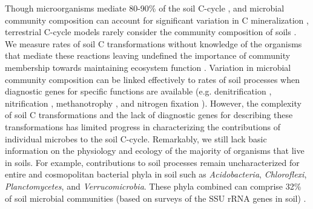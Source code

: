 Though microorganisms mediate 80-90\% of the soil C-cycle
\citep{ColemanCrossley_1996,Nannipieri_2003}, and microbial community
composition can account for significant variation in C mineralization
\citep{Strickland_2009} , terrestrial C-cycle models rarely consider the
community composition of soils \citep{Zak2006,Reed2007}. We measure rates of
soil C transformations without knowledge of the organisms that
mediate these reactions \citep{Nannipieri_2003} leaving undefined the
importance of community membership towards maintaining ecosystem function
\citep{Nannipieri_2003,Schimel_2012,Allison_2008}. Variation in microbial
community composition can be linked effectively to rates of soil processes when
diagnostic genes for specific functions are available (e.g. denitrification
\citep{Cavigelli2000}, nitrification \citep{Carney2004,Hawkes2005,Webster2005},
methanotrophy \citep{Gulledge1997}, and nitrogen fixation \citep{Hsu2009}).
However, the complexity of soil C transformations and the lack of diagnostic
genes for describing these transformations has limited progress in
characterizing the contributions of individual microbes to the soil C-cycle.
Remarkably, we still lack basic information on the physiology and ecology of
the majority of organisms that live in soils. For example, contributions to
soil processes remain uncharacterized for entire and cosmopolitan bacterial
phyla in soil  such as \textit{Acidobacteria}, \textit{Chloroflexi},
\textit{Planctomycetes}, and \textit{Verrucomicrobia}. These phyla combined can
comprise 32\% of soil microbial communities (based on surveys of the SSU rRNA
genes in soil) \citep{Janssen2006,Buckley2002}. 


